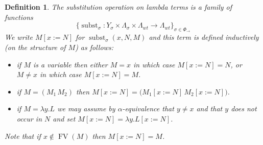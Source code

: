 \documentclass[english,letter paper,12pt,leqno]{article}
\theoremstyle{example}
\newtheorem{definition}[theorem]{Definition}
\numberwithin{equation}{section}
\begin{document}
\begin{definition}\label{defn:subst} The substitution operation on lambda terms is a family of functions
 \[
\big\{ \operatorname{subst}_\sigma: Y_\sigma \times \Lambda_{\sigma} \times \Lambda_{wt} \longrightarrow \Lambda_{wt} \big\}_{\sigma \in \Phi_{\rightarrow}} \]
We write $M[ x:= N ]$ for $\operatorname{subst}_\sigma( x, N, M )$ and this term is defined inductively (on the structure of $M$) as follows:
 \begin{itemize}
  \item if $M$ is a variable then either $M = x$ in which case $M[x := N] = N$, or $M \neq x$ in which case $M[ x:= N ] = M$.
  \item if $M = (M_1 \, M_2)$ then $M[x := N] = \big(M_1[x:= N] \, M_2[x := N]\big)$.
  \item if $M = \lambda y. L$ we may assume by $\alpha$-equivalence that $y \neq x$ and that $y$ does not occur in $N$ and set $M[x := N] = \lambda y. L[ x := N ]$. %
 \end{itemize}
 Note that if $x \notin \operatorname{FV}(M)$ then $M[ x:= N] = M$.
\end{definition}
\end{document}

